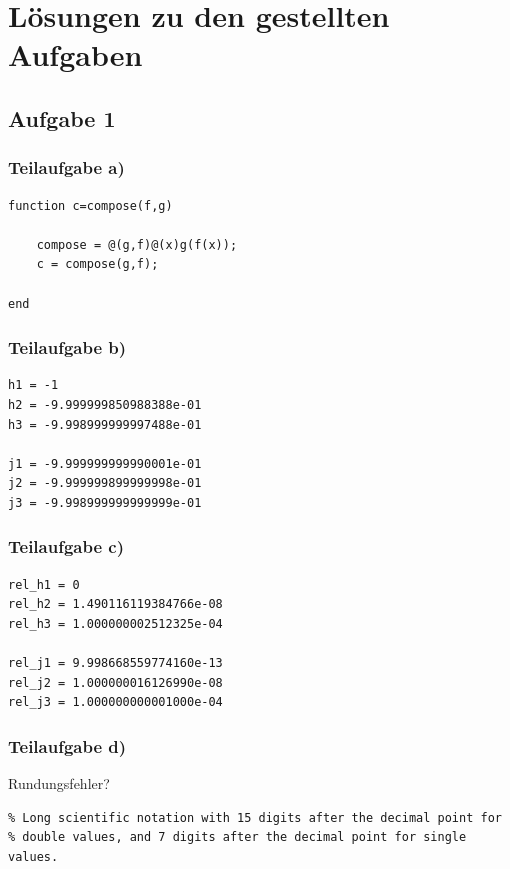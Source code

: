\documentclass{llncs}
\begin{document}
\chapter*{L\"osungen zu den gestellten Aufgaben}

\section*{Aufgabe 1}

\subsection*{Teilaufgabe a)}

\begin{verbatim}
function c=compose(f,g)

    compose = @(g,f)@(x)g(f(x));
    c = compose(g,f);
    
end
\end{verbatim}

\subsection*{Teilaufgabe b)}

\begin{verbatim}
h1 = -1
h2 = -9.999999850988388e-01
h3 = -9.998999999997488e-01

j1 = -9.999999999990001e-01
j2 = -9.999999899999998e-01
j3 = -9.998999999999999e-01
\end{verbatim}

\subsection*{Teilaufgabe c)}

\begin{verbatim}
rel_h1 = 0
rel_h2 = 1.490116119384766e-08
rel_h3 = 1.000000002512325e-04

rel_j1 = 9.998668559774160e-13
rel_j2 = 1.000000016126990e-08
rel_j3 = 1.000000000001000e-04
\end{verbatim}

\subsection*{Teilaufgabe d)}

Rundungsfehler?
\begin{verbatim}
% Long scientific notation with 15 digits after the decimal point for
% double values, and 7 digits after the decimal point for single values.
\end{verbatim}
\newpage
\end{document}
